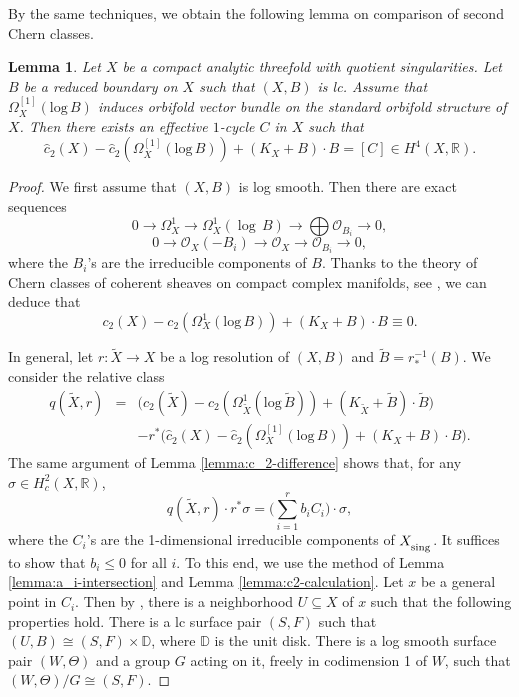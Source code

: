 \documentclass[12pt]{amsart}
\newcommand{\<}{\leq}
\newcommand{\num}{\equiv}
\def\mcO{\mathcal{O}}
\newtheorem{lemma}[theorem]{Lemma}
\theoremstyle{remark}
\theoremstyle{definition}
\theoremstyle{definition}
\numberwithin{equation}{section}
\theoremstyle{definition}
\theoremstyle{definition}
\def\sing{\operatorname{\textsubscript{\rm sing}}}
\begin{document}
By the same techniques, we obtain the following lemma on comparison of second Chern classes.


\begin{lemma}
\label{lemma:compare-log-c_2}
Let $X$ be a compact analytic threefold with quotient singularities. Let $B$ be a reduced boundary on $X$ such that $(X,B)$ is lc. 
Assume that $\Omega_X^{[1]}(\mathrm{log}\, B)$ induces orbifold vector bundle on the standard orbifold structure of $X$. 
Then there exists an effective $1$-cycle $C$ in $X$ such that 
\[
\hat{c}_2(X) - \hat{c}_2(\Omega_X^{[1]}(\mathrm{log}\, B)) + (K_X+B) \cdot B = [C] \in H^{4}(X, \mathbb{R}). 
\]
\end{lemma}

\begin{proof}
We first assume that $(X,B)$ is log smooth.  
Then there are exact sequences 
\[
0\to \Omega_X^1 \to \Omega_X^1(\log\, B) \to \bigoplus \mcO_{B_i} \to 0, 
\]
\[
0 \to \mcO_X(-B_i) \to \mcO_X \to \mcO_{B_i}\to 0,
\]
where the $B_i$'s are the irreducible components of $B$. 
Thanks to the theory of Chern classes of coherent sheaves on compact complex manifolds, see  \cite[Section 3]{Gri10}, we can deduce that 
\[c_2(X) - c_2(\Omega_X^{1}(\mathrm{log}\, B)) + (K_X+B) \cdot B\num 0.\] 

In general,  let $r\colon \widetilde{X} \to X$ be a log resolution of $(X,B)$ and $\widetilde{B} = r^{-1}_*(B)$. 
We consider the relative class 
\begin{eqnarray*}
 q(\widetilde{X}, r) &=& \Big({c}_2(\widetilde{X}) -  {c_2}(\Omega_{\widetilde{X}}^{1}(\mathrm{log}\, \widetilde{B})) + (K_{\widetilde{X}}+\widetilde{B}) \cdot \widetilde{B}\Big) \\
 && - r^*\Big(\hat{c}_2(X) - \hat{c}_2(\Omega_X^{[1]}(\mathrm{log}\, B)) + (K_X+B) \cdot B \Big).
\end{eqnarray*}
The same argument of Lemma \ref{lemma:c_2-difference}  shows that, 
for any $\sigma \in H^2_c(X,\mathbb{R})$, 
\[
 q(\widetilde{X}, r) \cdot r^*\sigma = \Big(\sum_{i=1}^r b_iC_i \Big) \cdot \sigma,  
\]
where the $C_i$'s  are the 1-dimensional irreducible components of $X_{\sing}$.  
It suffices to show that $b_i\< 0$ for all $i$. To this end, we use the method of Lemma \ref{lemma:a_i-intersection} and Lemma \ref{lemma:c2-calculation}. 
Let $x$ be a general point in $C_i$. 
 Then by  \cite[Proposition 16.6]{Kol92},   there is a neighborhood $U\subseteq X$ of $x$ such that the following properties hold. 
There is a lc surface pair $(S,F)$ such that $(U,B)\cong (S,F)\times \mathbb{D}$, where $\mathbb{D}$ is the unit disk. 
There is a log smooth surface pair $(W,\Theta)$ and a group $G$ acting on it, freely in codimension 1 of $W$, such that 
$(W,\Theta)/G \cong (S,F)$. 


\end{proof}
\end{document}
